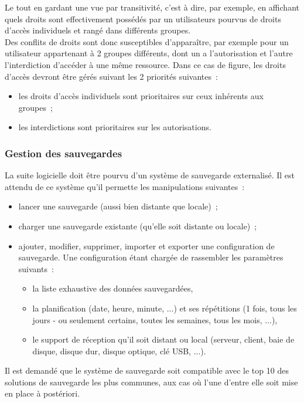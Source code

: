 Le tout en gardant une vue par transitivité, c'est à dire, par exemple, en affichant quels droits sont effectivement possédés par un utilisateurs pourvus de droits d'accès individuels et rangé dans différents groupes.
\\
Des conflits de droits sont donc susceptibles d'apparaître, par exemple pour un utilisateur appartenant à 2 groupes différents, dont un a l'autorisation et l'autre l'interdiction d'accéder à une même ressource.
Dans ce cas de figure, les droits d'accès devront être gérés suivant les 2 priorités suivantes~:
\begin{itemize}
	\item les droits d'accès individuels sont prioritaires sur ceux inhérents aux groupes~;
	\item les interdictions sont prioritaires sur les autorisations.
\end{itemize}

\subsubsection{Gestion des sauvegardes}
La suite logicielle doit être pourvu d'un système de sauvegarde externalisé.
Il est attendu de ce système qu'il permette les manipulations suivantes~:
\begin{itemize}
	\item lancer une sauvegarde (aussi bien distante que locale)~;
	\item charger une sauvegarde existante (qu'elle soit distante ou locale)~;
	\item ajouter, modifier, supprimer, importer et exporter une configuration de sauvegarde.
		Une configuration étant chargée de rassembler les paramètres suivants~:
	\begin{itemize}
		\item la liste exhaustive des données sauvegardées,
		\item la planification (date, heure, minute, ...) et ses répétitions (1 fois, tous les jours - ou seulement certains, toutes les semaines, tous les mois, ...),
		\item le support de réception qu'il soit distant ou local (serveur, client, baie de disque, disque dur, disque optique, clé USB, ...).
	\end{itemize}
\end{itemize}
\begin{constraint}
	Il est demandé que le système de sauvegarde soit compatible avec le top 10 des solutions de sauvegarde les plus communes, aux cas où l'une d'entre elle soit mise en place à postériori.
\end{constraint}

